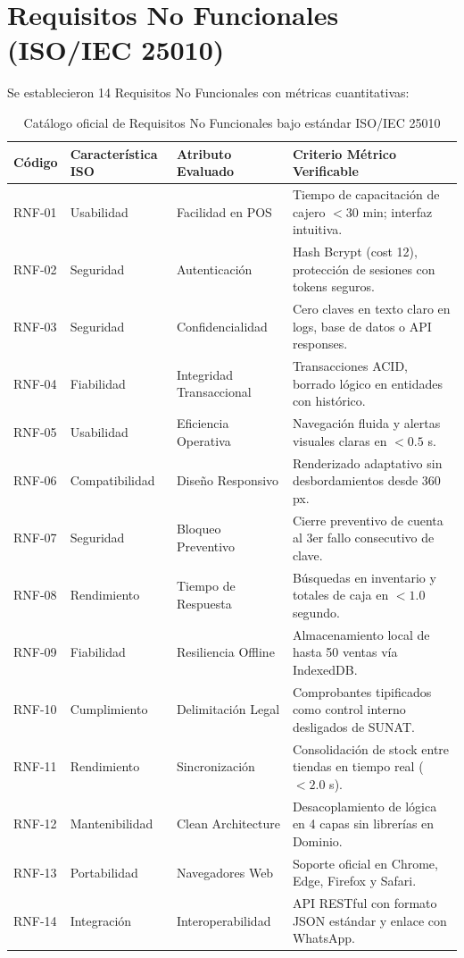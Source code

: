\section{Requisitos No Funcionales (ISO/IEC 25010)}
Se establecieron 14 Requisitos No Funcionales con métricas cuantitativas:

\begin{table}[H]
\centering
\small
\begin{tabularx}{\textwidth}{>{\ttfamily\centering}p{1.8cm} >{\raggedright}p{2.8cm} >{\raggedright}p{3.2cm} Y}
\toprule
\textbf{Código} & \textbf{Característica ISO} & \textbf{Atributo Evaluado} & \textbf{Criterio Métrico Verificable} \\
\midrule
RNF-01 & Usabilidad & Facilidad en POS & Tiempo de capacitación de cajero $< 30$ min; interfaz intuitiva. \\
RNF-02 & Seguridad & Autenticación & Hash Bcrypt (cost 12), protección de sesiones con tokens seguros. \\
RNF-03 & Seguridad & Confidencialidad & Cero claves en texto claro en logs, base de datos o API responses. \\
RNF-04 & Fiabilidad & Integridad Transaccional & Transacciones ACID, borrado lógico en entidades con histórico. \\
RNF-05 & Usabilidad & Eficiencia Operativa & Navegación fluida y alertas visuales claras en $< 0.5$ s. \\
RNF-06 & Compatibilidad & Diseño Responsivo & Renderizado adaptativo sin desbordamientos desde 360 px. \\
RNF-07 & Seguridad & Bloqueo Preventivo & Cierre preventivo de cuenta al 3er fallo consecutivo de clave. \\
RNF-08 & Rendimiento & Tiempo de Respuesta & Búsquedas en inventario y totales de caja en $< 1.0$ segundo. \\
RNF-09 & Fiabilidad & Resiliencia Offline & Almacenamiento local de hasta 50 ventas vía IndexedDB. \\
RNF-10 & Cumplimiento & Delimitación Legal & Comprobantes tipificados como control interno desligados de SUNAT. \\
RNF-11 & Rendimiento & Sincronización & Consolidación de stock entre tiendas en tiempo real ($< 2.0$ s). \\
RNF-12 & Mantenibilidad & Clean Architecture & Desacoplamiento de lógica en 4 capas sin librerías en Dominio. \\
RNF-13 & Portabilidad & Navegadores Web & Soporte oficial en Chrome, Edge, Firefox y Safari. \\
RNF-14 & Integración & Interoperabilidad & API RESTful con formato JSON estándar y enlace con WhatsApp. \\
\bottomrule
\end{tabularx}
\caption{Catálogo oficial de Requisitos No Funcionales bajo estándar ISO/IEC 25010}
\label{tab:rnfs_iso25010}
\end{table}

